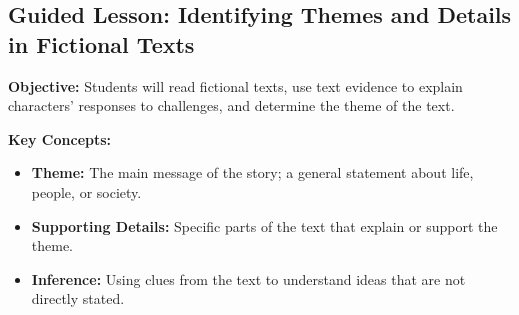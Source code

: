 \documentclass[12pt]{article}
\begin{document}
\subsection*{Guided Lesson: Identifying Themes and Details in Fictional Texts}
\onehalfspacing

\begin{tcolorbox}[colframe=black!40, colback=gray!5, 
coltitle=black, colbacktitle=black!20, fonttitle=\bfseries\Large, 
title=Learning Objective, halign title=center, left=5pt, right=5pt, top=5pt, bottom=15pt]
\textbf{Objective:} Students will read fictional texts, use text evidence to explain characters’ responses to challenges, and determine the theme of the text.
\end{tcolorbox}

\vspace{1em}

\begin{tcolorbox}[colframe=black!60, colback=white, 
coltitle=black, colbacktitle=black!15, fonttitle=\bfseries\Large, 
title=Key Concepts and Vocabulary, halign title=center, left=10pt, right=10pt, top=10pt, bottom=15pt]
\textbf{Key Concepts:}
\begin{itemize}
    \item \textbf{Theme:} The main message of the story; a general statement about life, people, or society.
    \item \textbf{Supporting Details:} Specific parts of the text that explain or support the theme.
    \item \textbf{Inference:} Using clues from the text to understand ideas that are not directly stated.
\end{itemize}
\end{tcolorbox}

\vspace{1em}
\end{document}
